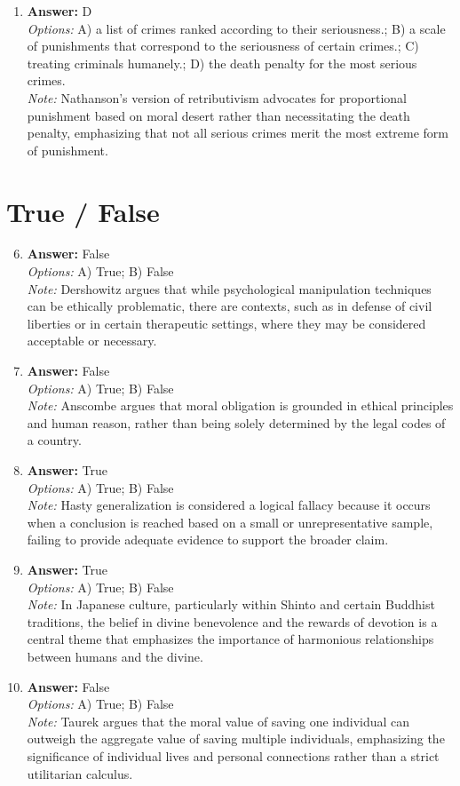 \documentclass[12pt]{article}
\begin{document}
\begin{enumerate}[label=\arabic*.]
\item \textbf{Answer:} D
\\ \textit{Options:} A) a list of crimes ranked according to their seriousness.; B) a scale of punishments that correspond to the seriousness of certain crimes.; C) treating criminals humanely.; D) the death penalty for the most serious crimes.
\\ \textit{Note:} Nathanson's version of retributivism advocates for proportional punishment based on moral desert rather than necessitating the death penalty, emphasizing that not all serious crimes merit the most extreme form of punishment.
\end{enumerate}

\section*{True / False}
\begin{enumerate}[label=\arabic*.]
\setcounter{enumi}{5}
\item \textbf{Answer:} False
\\ \textit{Options:} A) True; B) False
\\ \textit{Note:} Dershowitz argues that while psychological manipulation techniques can be ethically problematic, there are contexts, such as in defense of civil liberties or in certain therapeutic settings, where they may be considered acceptable or necessary.
\item \textbf{Answer:} False
\\ \textit{Options:} A) True; B) False
\\ \textit{Note:} Anscombe argues that moral obligation is grounded in ethical principles and human reason, rather than being solely determined by the legal codes of a country.
\item \textbf{Answer:} True
\\ \textit{Options:} A) True; B) False
\\ \textit{Note:} Hasty generalization is considered a logical fallacy because it occurs when a conclusion is reached based on a small or unrepresentative sample, failing to provide adequate evidence to support the broader claim.
\item \textbf{Answer:} True
\\ \textit{Options:} A) True; B) False
\\ \textit{Note:} In Japanese culture, particularly within Shinto and certain Buddhist traditions, the belief in divine benevolence and the rewards of devotion is a central theme that emphasizes the importance of harmonious relationships between humans and the divine.
\item \textbf{Answer:} False
\\ \textit{Options:} A) True; B) False
\\ \textit{Note:} Taurek argues that the moral value of saving one individual can outweigh the aggregate value of saving multiple individuals, emphasizing the significance of individual lives and personal connections rather than a strict utilitarian calculus.
\end{enumerate}
\end{document}
